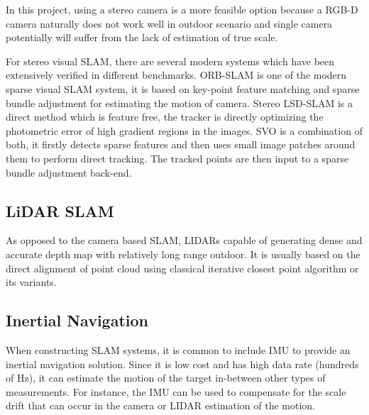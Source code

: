 In this project, using a stereo camera is a more feasible option
because a RGB-D camera naturally does not work well in outdoor scenario
and single camera potentially will suffer from the lack of estimation
of true scale.

For stereo visual \gls{SLAM}, there are several modern systems
which have been extensively verified in different
benchmarks. \gls{ORB}-\gls{SLAM}\cite{DBLP:journals/corr/Mur-ArtalT16a} is one
of the modern sparse visual \gls{SLAM}
system, it is based on key-point feature matching and sparse bundle
adjustment for estimating the motion of camera. Stereo LSD-SLAM\cite{7353631} is
a direct method which is feature free, the tracker is directly
optimizing the photometric error of  high gradient regions in the
images. SVO\cite{7782863} is a combination of both, it firstly detects sparse
features and then uses small image patches around them to perform
direct tracking. The tracked points are then input to a sparse bundle
adjustment back-end.

\subsection{LiDAR SLAM}

As opposed to the camera based \gls{SLAM}, \gls{LIDAR}s capable
of generating dense and accurate depth map with relatively long range
outdoor. It is usually based on the direct alignment of point cloud
using classical iterative closest point algorithm or its variants.

\subsection{Inertial Navigation}

When constructing \gls{SLAM} systems, it is common to include \gls{IMU} to
provide an inertial navigation solution. Since it is low
cost and has high data rate (hundreds of Hz), it can estimate the motion of the
target in-between other types of measurements. For instance, the \gls{IMU} can
be used to compensate for the scale drift that can occur in the camera or
\gls{LIDAR} estimation of the motion.




